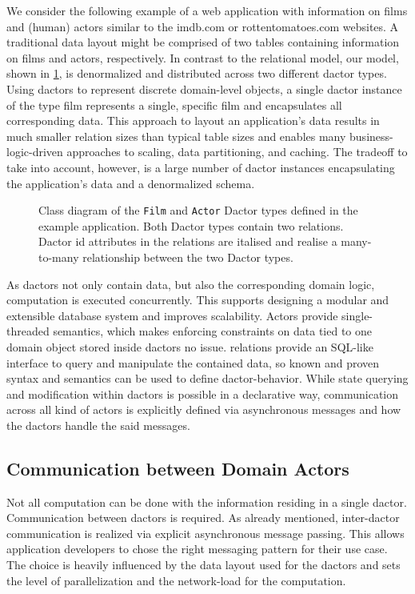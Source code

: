     We consider the following example of a web application with information on films and (human) actors similar to the imdb.com or rottentomatoes.com websites.
    A traditional data layout might be comprised of two tables containing information on films and actors, respectively.
    In contrast to the relational model, our model, shown in \cref{fig:dactor_diagram}, is denormalized and distributed across two different \gls{dactor} types.
    Using \glspl{dactor} to represent discrete domain-level objects, a single \gls{dactor} instance of the type film represents a single, specific film and encapsulates all corresponding data.
    This approach to layout an application's data results in much smaller \gls{relation} sizes than typical table sizes and enables many business-logic-driven approaches to scaling, data partitioning, and caching.
    The tradeoff to take into account, however, is a large number of \gls{dactor} instances encapsulating the application's data and a denormalized schema.

    \begin{figure}
      \centering
      
      \caption{Class diagram of the \texttt{Film} and \texttt{Actor} Dactor types defined in the example application. Both Dactor types contain two \glspl{relation}. Dactor id attributes in the relations are italised and realise a many-to-many relationship between the two Dactor types.}
      \label{fig:dactor_diagram}
    \end{figure}

    As \glspl{dactor} not only contain data, but also the corresponding domain logic, computation is executed concurrently.
    This supports designing a modular and extensible database system and improves scalability.
    Actors provide single-threaded semantics, which makes enforcing constraints on data tied to one domain object stored inside \glspl{dactor} no issue.
    \Glspl{relation} provide an SQL-like interface to query and manipulate the contained data, so known and proven syntax and semantics can be used to define \gls{dactor}-behavior.
    While state querying and modification within \glspl{dactor} is possible in a declarative way, communication across all kind of actors is explicitly defined via asynchronous messages and how the \glspl{dactor} handle the said messages.

  \subsection{Communication between Domain Actors}
    Not all computation can be done with the information residing in a single \gls{dactor}.
    Communication between \glspl{dactor} is required.
    As already mentioned, inter-\gls{dactor} communication is realized via explicit asynchronous message passing.
    This allows application developers to chose the right messaging pattern for their use case.
    The choice is heavily influenced by the data layout used for the \glspl{dactor} and sets the level of parallelization and the network-load for the computation.

